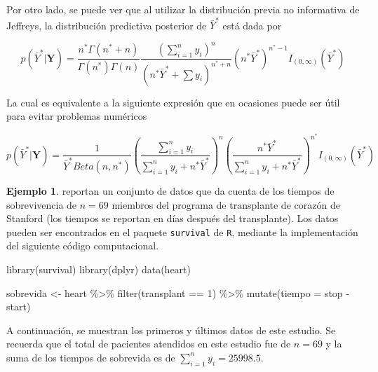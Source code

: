 \documentclass[
  10pt,
  spanish,
]{book}
\newenvironment{Shaded}{\begin{snugshade}}{\end{snugshade}}
\newcommand{\AttributeTok}[1]{\textcolor[rgb]{0.77,0.63,0.00}{#1}}
\newcommand{\DecValTok}[1]{\textcolor[rgb]{0.00,0.00,0.81}{#1}}
\newcommand{\FunctionTok}[1]{\textcolor[rgb]{0.00,0.00,0.00}{#1}}
\newcommand{\NormalTok}[1]{#1}
\newcommand{\OtherTok}[1]{\textcolor[rgb]{0.56,0.35,0.01}{#1}}
\newcommand{\SpecialCharTok}[1]{\textcolor[rgb]{0.00,0.00,0.00}{#1}}
\theoremstyle{definition}
\theoremstyle{definition}
\newtheorem{example}{Ejemplo}[chapter]
\theoremstyle{definition}
\theoremstyle{definition}
\theoremstyle{remark}
\begin{document}
Por otro lado, se puede ver que al utilizar la distribución previa no informativa de Jeffreys, la distribución predictiva posterior de \(\bar{Y}^*\) está dada por

\begin{equation}
\label{eq:PredExpoJeffreys1}
p(\bar{Y}^*|\mathbf{Y})=\frac{n^*\Gamma(n^*+n)}{\Gamma(n^*)\Gamma(n)}\frac{(\sum_{i=1}^ny_i)^n}{(n^*\bar{Y}^*+\sum y_i)^{n^*+n}}(n^*\bar{Y}^*)^{n^*-1}I_{(0,\infty)}(\bar{Y}^*)
\end{equation}

La cual es equivalente a la siguiente expresión que en ocasiones puede ser útil para evitar problemas numéricos

\begin{equation}
\label{eq:PredExpoJeffreys2}
p(\bar{Y}^*|\mathbf{Y})=\frac{1}{\bar{Y}^*Beta(n,n^*)}\left(\frac{\sum_{i=1}^ny_i}{\sum_{i=1}^ny_i+n^*\bar{Y}^*}\right)^n\left(\frac{n^*\bar{Y}^*}{\sum_{i=1}^ny_i+n^*\bar{Y}^*}\right)^{n^*}I_{(0,\infty)}(\bar{Y}^*)
\end{equation}

\begin{example}
\protect\hypertarget{exm:unnamed-chunk-60}{}{\label{exm:unnamed-chunk-60} }\citet{survi} reportan un conjunto de datos que da cuenta de los tiempos de sobrevivencia de \(n=69\) miembros del programa de transplante de corazón de Stanford (los tiempos se reportan en días después del transplante). Los datos pueden ser encontrados en el paquete \texttt{survival} \citet{survival} de \texttt{R}, mediante la implementación del siguiente código computacional.
\end{example}

\begin{Shaded}
\begin{Highlighting}[]
\FunctionTok{library}\NormalTok{(survival)}
\FunctionTok{library}\NormalTok{(dplyr)}
\FunctionTok{data}\NormalTok{(heart)}

\NormalTok{sobrevida }\OtherTok{\textless{}{-}}\NormalTok{ heart }\SpecialCharTok{\%\textgreater{}\%}
  \FunctionTok{filter}\NormalTok{(transplant }\SpecialCharTok{==} \DecValTok{1}\NormalTok{) }\SpecialCharTok{\%\textgreater{}\%}
  \FunctionTok{mutate}\NormalTok{(}\AttributeTok{tiempo =}\NormalTok{ stop }\SpecialCharTok{{-}}\NormalTok{ start)}
\end{Highlighting}
\end{Shaded}

A continuación, se muestran los primeros y últimos datos de este estudio. Se recuerda que el total de pacientes atendidos en este estudio fue de \(n=69\) y la suma de los tiempos de sobrevida es de \(\sum_{i=1}^ny_i=25998.5\).
\end{document}
